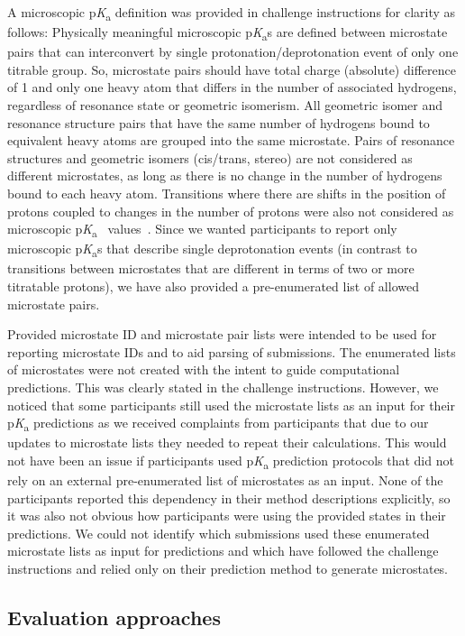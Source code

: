 \documentclass[9pt,lineno,final]{elife}
\newcommand{\pKa}{p\textit{K}\textsubscript{a}}
\begin{document}
A microscopic \pKa{} definition was provided in challenge instructions for clarity as follows:
Physically meaningful microscopic \pKa{}s are defined between microstate pairs that can interconvert by single protonation/deprotonation event of only one titrable group. 
So, microstate pairs should have total charge (absolute) difference of 1 and only one heavy atom that differs in the number of associated hydrogens, regardless of resonance state or geometric isomerism. 
All geometric isomer and resonance structure pairs that have the same number of hydrogens bound to equivalent heavy atoms are grouped into the same microstate. 
Pairs of resonance structures and geometric isomers (cis/trans, stereo) are not considered as different microstates, as long as there is no change in the number of hydrogens bound to each heavy atom.
Transitions where there are shifts in the position of protons coupled to changes in the number of protons were also not considered as microscopic \pKa{}~ values~\citep{Gunner:2020:J.Comput.AidedMol.Des.}.
Since we wanted participants to report only microscopic \pKa{}s that describe single deprotonation events (in contrast to transitions between microstates that are different in terms of two or more titratable protons), we have also provided a pre-enumerated list of allowed microstate pairs.


Provided microstate ID and microstate pair lists were intended to be used for reporting microstate IDs and to aid parsing of submissions. 
The enumerated lists of microstates were not created with the intent to guide computational predictions. 
This was clearly stated in the challenge instructions. 
However, we noticed that some participants still used the microstate lists as an input for their \pKa{} predictions as we received complaints from participants that due to our updates to microstate lists they needed to repeat their calculations. 
This would not have been an issue if participants used \pKa{} prediction protocols that did not rely on an external pre-enumerated list of microstates as an input.
None of the participants reported this dependency in their method descriptions explicitly, so it was also not obvious how participants were using the provided states in their predictions.
We could not identify which submissions used these enumerated microstate lists as input for predictions and which have followed the challenge instructions and relied only on their prediction method to generate microstates.

\subsection{Evaluation approaches}
\end{document}
